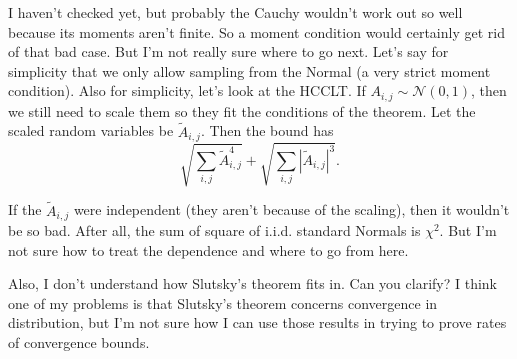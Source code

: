 \documentclass{amsart}
\begin{document}
I haven't checked yet, but probably the Cauchy wouldn't work out so well because its moments aren't finite.  So a moment condition
would certainly get rid of that bad case.  But I'm not really sure where to go next.  Let's say for simplicity that we only
allow sampling from the Normal (a very strict moment condition).  Also for simplicity, let's look at the HCCLT.
If $A_{i, j} \sim \mathcal{N}(0, 1)$, then we still need to scale them so they fit the conditions of the theorem.  Let the
scaled random variables be $\tilde{A}_{i, j}$.  Then the bound has
\begin{equation*}
  \sqrt{\sum_{i,j}\tilde{A}_{i, j}^4} + \sqrt{\sum_{i,j}|\tilde{A}_{i, j}|^3}.
\end{equation*}

If the $\tilde{A}_{i, j}$ were independent (they aren't because of the scaling), then it wouldn't be so bad.  After all,
the sum of square of i.i.d. standard Normals is $\chi^2$.  But I'm not sure how to treat the dependence and where to go
from here.

Also, I don't understand how Slutsky's theorem fits in.  Can you clarify?  I think one of my problems is that Slutsky's theorem
concerns convergence in distribution, but I'm not sure how I can use those results in trying to prove rates of convergence
bounds.
\end{document}
